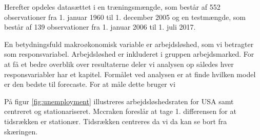 %
Herefter opdeles datasættet i en træningsmængde, som består af 552 observationer fra 1. januar 1960 til 1. december 2005 og en testmængde, som består af 139 observationer fra 1. januar 2006 til 1. juli 2017. 

En betydningsfuld makroøkonomisk variable er arbejdsløshed, som vi betragter som responsvariabel.  
Arbejdsløshed er inkluderet i gruppen arbejdsmarked.
For at få et bedre overblik over resultaterne deler vi analysen op således hver responsvariabler har et kapitel. 
Formålet ved analysen er at finde hvilken model er den bedste til forecaste. For at måle dette bruger vi 

På figur \ref{fig:unemployment} illustreres arbejdsløshedsraten for USA samt centreret og stationariseret.
Mccraken foreslår at tage 1. differensen for at tidsrækken er stationær.
Tidsrækken centreres da vi da kan se bort fra skæringen.
%
%